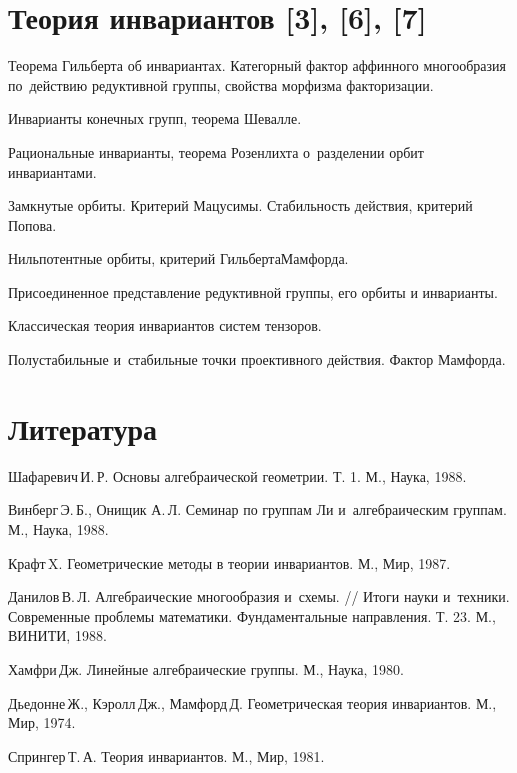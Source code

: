 \documentclass[a4paper]{article}
\begin{document}
\section*{Теория инвариантов [3], [6], [7]}
\begin{items}{-2}
\item Теорема Гильберта об инвариантах. Категорный фактор аффинного многообразия
по~действию редуктивной группы, свойства морфизма факторизации.
\item Инварианты конечных групп, теорема Шевалле.
\item Рациональные инварианты, теорема Розенлихта о~разделении орбит инвариантами.
\item Замкнутые орбиты. Критерий Мацусимы. Стабильность действия, критерий Попова.
\item Нильпотентные орбиты, критерий Гильберта\ч Мамфорда.
\item Присоединенное представление редуктивной группы, его орбиты и инварианты.
\item Классическая теория инвариантов систем тензоров.
\item Полустабильные и~стабильные точки проективного действия. Фактор Мамфорда.
\end{items}

\section*{Литература}
\begin{nums}{-2}
\item Шафаревич\,И.\,Р. Основы алгебраической геометрии. Т. 1. М., Наука, 1988.
\item Винберг\,Э.\,Б., Онищик А.\,Л. Семинар по группам Ли и~алгебраическим группам. М., Наука, 1988.
\item Крафт\,X. Геометрические методы в теории инвариантов. М., Мир, 1987.
\item Данилов\,В.\,Л. Алгебраические многообразия и~схемы. // Итоги науки и~техники.
Современные проблемы математики. Фундаментальные направления. Т. 23. М., ВИНИТИ, 1988.
\item Хамфри\,Дж. Линейные алгебраические группы. М., Наука, 1980.
\item Дьедонне\,Ж., Кэролл\,Дж., Мамфорд\,Д. Геометрическая теория инвариантов. М., Мир, 1974.
\item Спрингер\,Т.\,А. Теория инвариантов. М., Мир, 1981.
\end{nums}

\medskip\dmvntrail
\end{document}
